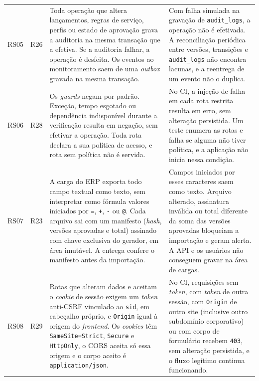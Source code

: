 \documentclass[conference]{IEEEtran}
\begin{document}
\begin{table}[!t]
\begin{tabularx}{\textwidth}{@{}l l Y Y@{}}
RS05 & R26 &
Toda operação que altera lançamentos, regras de serviço, perfis ou estado de aprovação grava a auditoria na mesma transação que a efetiva. Se a auditoria falhar, a operação é desfeita. Os eventos ao monitoramento saem de uma \textit{outbox} gravada na mesma transação. &
Com falha simulada na gravação de \texttt{audit\_logs}, a operação não é efetivada. A reconciliação periódica entre versões, transições e \texttt{audit\_logs} não encontra lacunas, e a reentrega de um evento não o duplica. \\
RS06 & R28 &
Os \textit{guards} negam por padrão. Exceção, tempo esgotado ou dependência indisponível durante a verificação resulta em negação, sem efetivar a operação. Toda rota declara a sua política de acesso, e rota sem política não é servida. &
No CI, a injeção de falha em cada rota restrita resulta em erro, sem alteração persistida. Um teste enumera as rotas e falha se alguma não tiver política, e a aplicação não inicia nessa condição. \\
RS07 & R23 &
A carga do ERP exporta todo campo textual como texto, sem interpretar como fórmula valores iniciados por \texttt{=}, \texttt{+}, \texttt{-} ou \texttt{@}. Cada arquivo sai com um manifesto (\textit{hash}, versões aprovadas e total) assinado com chave exclusiva do gerador, em área imutável. A entrega confere o manifesto antes da importação. &
Campos iniciados por esses caracteres saem como texto. Arquivo alterado, assinatura inválida ou total diferente da soma das versões aprovadas bloqueiam a importação e geram alerta. A API e os usuários não conseguem gravar na área de cargas. \\
RS08 & R29 &
Rotas que alteram dados e aceitam o \textit{cookie} de sessão exigem um \textit{token} anti-CSRF vinculado ao \texttt{sid}, em cabeçalho próprio, e \texttt{Origin} igual à origem do \textit{frontend}. Os \textit{cookies} têm \texttt{SameSite=Strict}, \texttt{Secure} e \texttt{HttpOnly}, o CORS aceita só essa origem e o corpo aceito é \texttt{application/json}. &
No CI, requisições sem \textit{token}, com \textit{token} de outra sessão, com \texttt{Origin} de outro site (inclusive outro subdomínio corporativo) ou com corpo de formulário recebem \texttt{403}, sem alteração persistida, e o fluxo legítimo continua funcionando. \\
\hline
\end{tabularx}
\end{table}
\end{document}
